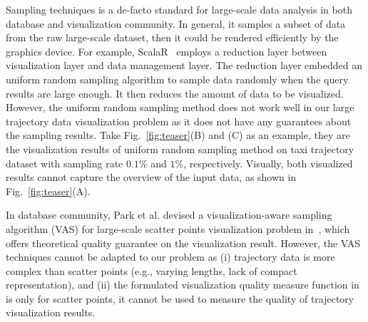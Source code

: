 Sampling techniques is a de-facto standard for large-scale data analysis in both database and visualization community.
In general, it samples a subset of data from the raw large-scale dataset, then it could be rendered efficiently by the graphics device.
For example, ScalaR~\cite{battle2013dynamic} employs a reduction layer between visualization layer and data management layer.
The reduction layer embedded an uniform random sampling algorithm to sample data randomly when the query results are large enough.
It then reduces the amount of data to be visualized.
However, the uniform random sampling method does not work well in our large trajectory data visualization problem as it does not have any guarantees about the sampling results.
Take Fig.~\ref{fig:teaser}(B) and (C) as an example,
they are the visualization results of uniform random sampling method on \pt{} taxi trajectory dataset with sampling rate $0.1\%$ and $1\%$, respectively.
Visually, both visualized results cannot capture the overview of the input data, as shown in Fig.~\ref{fig:teaser}(A).

In database community,  Park et al. devised a visualization-aware sampling algorithm (VAS) for large-scale scatter points visualization problem in~\cite{park2016visualization},
which offers theoretical quality guarantee on the visualization result.
However, the VAS techniques cannot be adapted to our problem as  (i) trajectory data is  more complex than scatter points (e.g., varying lengths, lack of compact representation),
and  (ii) the formulated visualization quality measure function in~\cite{park2016visualization} is only for scatter points, it cannot be used to measure the quality of trajectory visualization results.

